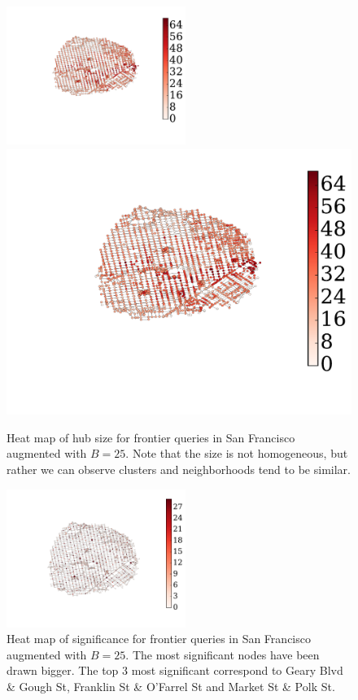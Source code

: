 	
\begin{figure}
\begin{minipage}[t]{.51\textwidth}
\centering
\includegraphics[clip, trim=4.5cm 4.8cm 4.7cm 3cm,height=4.5cm]{TexImg/SF_hub_sizes.pdf}
\includegraphics[clip, trim=15.8cm 0cm 0.4cm 1cm,scale=0.3]{TexImg/SF_hub_sizes.pdf}
\caption{Heat map of hub size for frontier queries in San Francisco augmented with $B=25$.
Note that the size is not homogeneous, but rather we can observe clusters and neighborhoods tend to be similar.}\label{fig:SF_hub_size_map}
\end{minipage}
\hfill
\begin{minipage}[t]{.46\textwidth}
\centering
\includegraphics[clip, trim=3.7cm 2.9cm 4.2cm 3cm,height=4.5cm]{TexImg/sig_colapse.pdf}
\caption{Heat map of significance for frontier queries in San Francisco augmented with $B=25$.
The most significant nodes have been drawn bigger.
The top 3 most significant correspond to Geary Blvd \& Gough St, Franklin St \& O'Farrel St and Market St \& Polk St.}
\label{fig:sig_colapse}
\end{minipage}
\end{figure}

